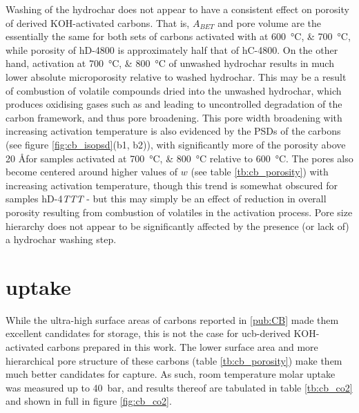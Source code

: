 Washing of the \gls{hydrochar} does not appear to have a consistent effect on porosity of derived KOH-activated carbons. That is,  $A_{BET}$ and pore volume are the essentially the same for both sets of carbons activated with  at \qtylist[list-units=single]{600;700}{\degreeCelsius}, while porosity of hD-4800 is approximately half that of hC-4800. On the other hand, activation at \qtylist[list-final-separator={or }, list-units=single]{700;800}{\degreeCelsius} of unwashed \gls{hydrochar} results in much lower absolute microporosity relative to washed \gls{hydrochar}. This may be a result of combustion of volatile compounds dried into the unwashed \gls{hydrochar}, which produces oxidising gases such as  and  leading to uncontrolled degradation of the carbon framework, and thus pore broadening.\citep{Sevilla2014Energy, Blankenship2022Modulating} This pore width broadening with increasing activation temperature is also evidenced by the PSDs of the carbons (see figure \ref{fig:cb_isopsd}(b1, b2)), with significantly more of the porosity above 20 \AA\space for samples activated at \qtylist[list-final-separator={or }, list-units=single]{700;800}{\degreeCelsius} relative to \qty{600}{\degreeCelsius}. The pores also become centered around higher values of $w$ (see table \ref{tb:cb_porosity}) with increasing activation temperature, though this trend is somewhat obscured for samples hD-4\textit{TTT} - but this may simply be an effect of reduction in overall porosity resulting from combustion of volatiles in the activation process. Pore size hierarchy does not appear to be significantly affected by the presence (or lack of) a \gls{hydrochar} washing step.

\section{\texorpdfstring{ uptake}{CO2 uptake}}

While the ultra-high surface areas of carbons reported in \ref{pub:CB} made them excellent candidates for  storage, this is not the case for \acrshort{ucb}-derived KOH-activated carbons prepared in this work. The lower surface area and more hierarchical pore structure of these carbons (table \ref{tb:cb_porosity}) make them much better candidates for  capture. As such, room temperature molar  uptake was measured up to \qty{40}{\bar}, and results thereof are tabulated in table \ref{tb:cb_co2} and shown in full in figure \ref{fig:cb_co2}. 

